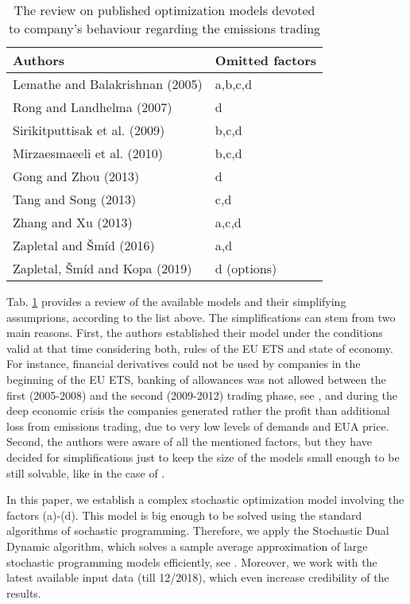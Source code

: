\documentclass[3p,times]{elsarticle}
\begin{document}
\begin{table}[htbp]               
\centering
\begin{tabular}{l|l}\hline
Authors & Omitted factors\\ \hline
Lemathe and Balakrishnan (2005)& a,b,c,d\\
Rong and Landhelma (2007)& d\\
Sirikitputtisak et al. (2009)& b,c,d\\
Mirzaesmaeeli et al. (2010)& b,c,d\\
Gong and Zhou (2013) & d\\
Tang and Song (2013)& c,d\\
Zhang and Xu (2013)& a,c,d\\
Zapletal and \v Sm\' id (2016)& a,d \\
Zapletal, \v Sm\' id and Kopa (2019)& d (options)\\\hline

\end{tabular}
\caption{The review on published optimization models devoted to company's behaviour regarding the emissions trading}
\label{tab1}
\end{table}


Tab. \ref{tab1} provides a review of the available models and their simplifying assumprions, according to the list above. The simplifications can stem from two main reasons. First, the authors established their model under the conditions valid at that time considering both, rules of the EU ETS and state of economy. For instance, financial derivatives could not be used by companies in the beginning of the EU ETS, banking of allowances was not allowed between the first (2005-2008) and the second (2009-2012) trading phase, see \citet{zapletal3}, and during the deep economic crisis the companies generated rather the profit than additional loss from emissions trading, due to very low levels of demands and EUA price. Second, the authors were aware of all the mentioned factors, but they have decided for simplifications just to keep the size of the models small enough to be still solvable, like in the case of \citet{anor}.

In this paper, we establish a complex stochastic optimization model involving the factors (a)-(d). This model is big enough to be solved using the standard algorithms of sochastic programming. Therefore, we apply the Stochastic Dual Dynamic algorithm, which solves a sample average approximation of large stochastic programming models efficiently, see \citet{pereira1991multi}. Moreover, we work with the latest available input data (till 12/2018), which even increase credibility of the results. 
\end{document}
